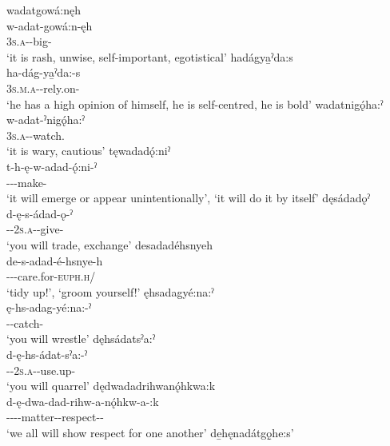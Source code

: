 \ea\label{ex:rflsrfex5}
\ea wadatgowá:nęh\\
\gll w-adat-gowá:n-ęh\\
 \textsc{3s.a}-{}-big-{\stative}\\
\glt `it is rash, unwise, self-important, egotistical'
\ex hadágya̱ˀda:s\\
\gll ha-dág-ya̱ˀda:-s\\
 \textsc{3s.m.a}-{}-rely.on-{\habitual}\\
\glt `he has a high opinion of himself, he is self-centred, he is bold'
\ex wadatnigǫ́ha:ˀ\\
\gll w-adat-ˀnigǫ́ha:ˀ\\
 \textsc{3s.a}-{}-watch.{\habitual}\\
\glt `it is wary, cautious'
\ex tęwadadǫ́:niˀ\\
\gll t-h-ę-w-adad-ǫ́:ni-ˀ\\
 {\contrastive}--{}-make-{\punctual}\\
\glt  ‘it will emerge or appear unintentionally’, `it will do it by itself'
\ex dęsádadǫˀ\\
\gll d-ę-s-ádad-ǫ-ˀ\\
 {\dualic}-{\future}-\textsc{2s.a}-{}-give-{\punctual}\\
\glt `you will trade, exchange'
\ex desadadéhsnyeh \\
\gll de-s-adad-é-hsnye-h\\
 {\dualic}--{\joinerE}-care.for-\textsc{euph.h}/{\noaspect}\\
\glt ‘tidy up!’, `groom yourself!'
\ex ęhsadagyé:na:ˀ\\
\gll ę-hs-adag-yé:na:-ˀ\\
 -{}-catch-{\punctual}\\
\glt `you will wrestle'
\ex dęhsádatsˀa:ˀ\\
\gll d-ę-hs-ádat-sˀa:-ˀ\\
 {\dualic}-{\future}-\textsc{2s.a}-{}-use.up-{\punctual}\\
\glt `you will quarrel'
\ex dędwadadrihwanǫ́hkwa:k\\
\gll d-ę-dwa-dad-rihw-a-nǫ́hkw-a-:k\\
 {\dualic}-{\future}--{}-matter-{\joinerA}-respect-{\joinerA}-\\
\glt `we all will show respect for one another'
\ex de̱hęnadátgǫ̱he:s’\\
